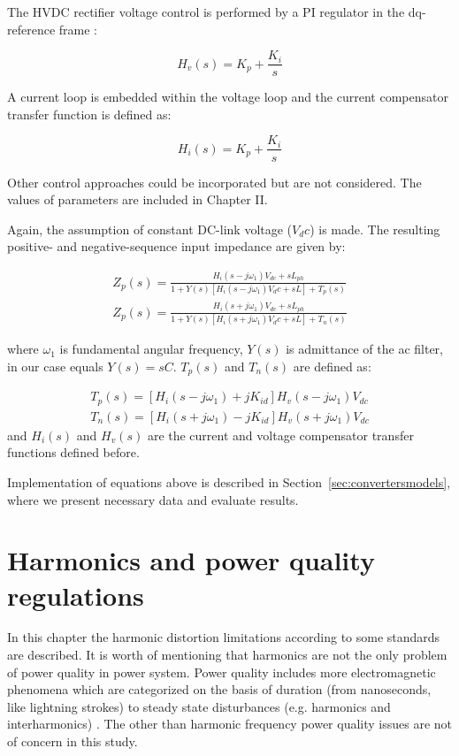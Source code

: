 \documentclass[12pt]{report} %
\begin{document}
The HVDC rectifier voltage control is performed by a PI regulator in the dq-reference frame \cite{liusun2014}:

\begin{equation}
	H_v (s)=K_p +\dfrac{K_i}{s}
\end{equation}

A current loop is embedded within the voltage loop and the current compensator transfer function is defined as:

\begin{equation}
	H_i (s)=K_p +\dfrac{K_i}{s}
\end{equation}

Other control approaches could be incorporated but are not considered. The values of parameters are included in Chapter II.

Again, the assumption of constant DC-link voltage ($V_dc$) is made. The resulting positive- and negative-sequence input impedance are given by:

\begin{equation} \label{eq:impedance_hvdc}
\begin{aligned}
	Z_p (s)=\frac{H_i (s-j\omega_1)V_{dc} +sL_{ph}}{1+Y(s)[H_i (s-j\omega_1 )V_dc +sL]+T_p (s)} \\
	Z_p (s)=\frac{H_i (s+j\omega_1)V_{dc} +sL_{ph}}{1+Y(s)[H_i (s+j\omega_1 )V_dc +sL]+T_n (s)}
\end{aligned}
\end{equation}

where $\omega_1$ is fundamental angular frequency, $Y(s)$ is admittance of the ac filter, in our case equals $Y(s)=sC$. $T_p (s)$ and $T_n (s)$ are defined as:

\begin{equation}
\begin{aligned}
	T_p (s)=[H_i (s-j\omega_1 )+jK_{id} ]H_v (s-j\omega_1 )V_{dc} \\
	T_n (s)=[H_i (s+j\omega_1 )-jK_{id} ]H_v (s+j\omega_1 )V_{dc}
\end{aligned}
\end{equation}
and $H_i (s)$ and $H_v (s)$ are the current and voltage compensator transfer functions defined before.

Implementation of equations above is described in Section~\ref{sec:convertersmodels}, where we present necessary data and evaluate results.

\section{Harmonics and power quality regulations} \label{sec:harmonicregulations}
In this chapter the harmonic distortion limitations according to some standards are described. It is worth of mentioning that harmonics are not the only problem of power quality in power system. Power quality includes more electromagnetic phenomena which are categorized on the basis of duration (from nanoseconds, like lightning strokes) to steady state disturbances (e.g. harmonics and interharmonics) \cite{das}. The other than harmonic frequency power quality issues are not of concern in this study. 
\end{document}
